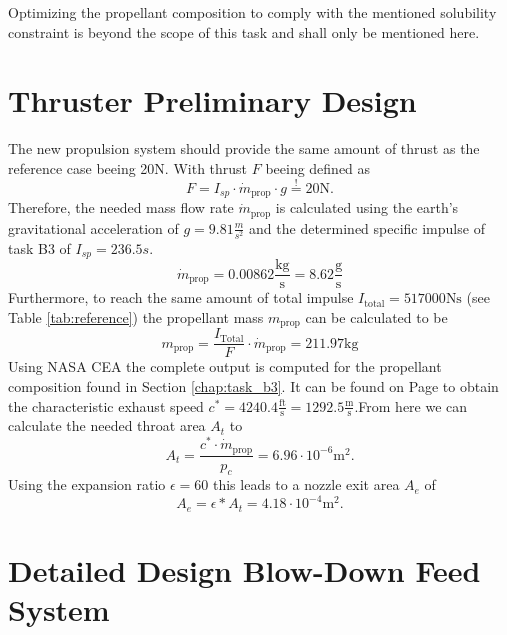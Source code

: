 \documentclass[12pt]{article}
\begin{document}
Optimizing the propellant composition to comply with the mentioned solubility constraint is beyond the scope of this task and shall only be mentioned here.

\section{Thruster Preliminary Design}
The new propulsion system should provide the same amount of thrust as the reference case beeing 20N. With thrust $F$ beeing defined as
\begin{equation*}
	F = I_{sp} \cdot \dot{m}_{\text{prop}} \cdot g \overset{!}{=} 20\text{N}.
\end{equation*}
Therefore, the needed mass flow rate $\dot{m}_{\text{prop}}$ is calculated using the earth's gravitational acceleration of $g=9.81\frac{m}{s^2}$ and the determined specific impulse of task B3 of $I_{sp}=236.5s$.
\begin{equation*}
	\dot{m}_{\text{prop}} = 0.00862 \frac{\text{kg}}{\text{s}} = 8.62 \frac{\text{g}}{\text{s}}
\end{equation*}
Furthermore, to reach the same amount of total impulse $I_{\text{total}}=517000\text{Ns}$ (see Table \ref{tab:reference}) the propellant mass $m_{\text{prop}}$ can be calculated to be
\begin{equation*}
	m_{\text{prop}} = \frac{I_{\text{Total}}}{F} \cdot \dot{m}_{\text{prop}} =  211.97\text{kg}
\end{equation*}
Using NASA CEA the complete output is computed for the propellant composition found in Section \ref{chap:task_b3}. It can be found on Page \pageref{chap:cea_output} to obtain the characteristic exhaust speed $c^*=4240.4\frac{\text{ft}}{\text{s}}=1292.5\frac{\text{m}}{\text{s}}$.From here we can calculate the needed throat area $A_t$ to
\begin{equation*}
	A_t = \frac{c^* \cdot \dot{m}_{\text{prop}}}{p_c} = 6.96 \cdot 10^{-6} \text{m}^2.
\end{equation*}
Using the expansion ratio $\epsilon=60$ this leads to a nozzle exit area $A_e$ of
\begin{equation*}
A_e = \epsilon * A_t = 4.18 \cdot 10^{-4} \text{m}^2.
\end{equation*}

\section{Detailed Design Blow-Down Feed System}
\end{document}
